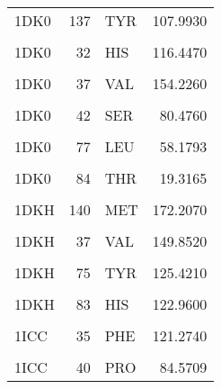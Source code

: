 \begin{table}
\begin{tabular}{lrlr}
			1DK0 & 137 & TYR & 107.9930\\
			\addlinespace
			\cellcolor{gray!6}{1DK0} & \cellcolor{gray!6}{140} & \cellcolor{gray!6}{MET} & \cellcolor{gray!6}{173.4760}\\
			1DK0 & 32 & HIS & 116.4470\\
			\cellcolor{gray!6}{1DK0} & \cellcolor{gray!6}{33} & \cellcolor{gray!6}{THR} & \cellcolor{gray!6}{13.7171}\\
			1DK0 & 37 & VAL & 154.2260\\
			\cellcolor{gray!6}{1DK0} & \cellcolor{gray!6}{41} & \cellcolor{gray!6}{ASN} & \cellcolor{gray!6}{80.6960}\\
			\addlinespace
			1DK0 & 42 & SER & 80.4760\\
			\cellcolor{gray!6}{1DK0} & \cellcolor{gray!6}{75} & \cellcolor{gray!6}{TYR} & \cellcolor{gray!6}{131.4420}\\
			1DK0 & 77 & LEU & 58.1793\\
			\cellcolor{gray!6}{1DK0} & \cellcolor{gray!6}{83} & \cellcolor{gray!6}{HIS} & \cellcolor{gray!6}{102.7520}\\
			1DK0 & 84 & THR & 19.3165\\
			\addlinespace
			\cellcolor{gray!6}{1DKH} & \cellcolor{gray!6}{137} & \cellcolor{gray!6}{TYR} & \cellcolor{gray!6}{103.9420}\\
			1DKH & 140 & MET & 172.2070\\
			\cellcolor{gray!6}{1DKH} & \cellcolor{gray!6}{32} & \cellcolor{gray!6}{HIS} & \cellcolor{gray!6}{121.3750}\\
			1DKH & 37 & VAL & 149.8520\\
			\cellcolor{gray!6}{1DKH} & \cellcolor{gray!6}{42} & \cellcolor{gray!6}{SER} & \cellcolor{gray!6}{32.8371}\\
			\addlinespace
			1DKH & 75 & TYR & 125.4210\\
			\cellcolor{gray!6}{1DKH} & \cellcolor{gray!6}{77} & \cellcolor{gray!6}{LEU} & \cellcolor{gray!6}{66.1552}\\
			1DKH & 83 & HIS & 122.9600\\
			\cellcolor{gray!6}{1DKH} & \cellcolor{gray!6}{84} & \cellcolor{gray!6}{THR} & \cellcolor{gray!6}{31.3703}\\
			1ICC & 35 & PHE & 121.2740\\
			\addlinespace
			\cellcolor{gray!6}{1ICC} & \cellcolor{gray!6}{39} & \cellcolor{gray!6}{HIS} & \cellcolor{gray!6}{101.5070}\\
			1ICC & 40 & PRO & 84.5709\\

\end{tabular}
\end{table}
